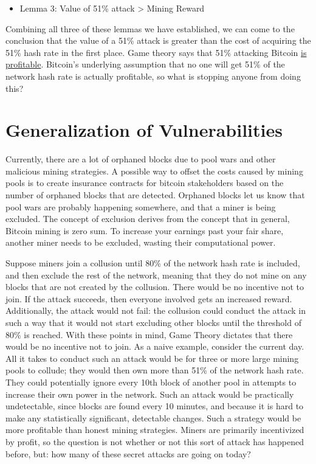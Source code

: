 \documentclass[full.tex]{subfiles}
\begin{document}
    \begin{itemize}
        \item Lemma 3: Value of 51\% attack > Mining Reward
    \end{itemize}
    
    Combining all three of these lemmas we have established, we can come to the conclusion that the value of a 51\% attack is greater than the cost of acquiring the 51\% hash rate in the first place. Game theory says that 51\% attacking Bitcoin \underline{is profitable}. Bitcoin's underlying assumption that no one will get 51\% of the network hash rate is actually profitable, so what is stopping anyone from doing this?
    
    \section*{Generalization of Vulnerabilities}
    
    Currently, there are a lot of orphaned blocks due to pool wars and other malicious mining strategies. A possible way to offset the costs caused by mining pools is to create insurance contracts for bitcoin stakeholders based on the number of orphaned blocks that are detected. Orphaned blocks let us know that pool wars are probably happening somewhere, and that a miner is being excluded. The concept of exclusion derives from the concept that in general, Bitcoin mining is zero sum. To increase your earnings past your fair share, another miner needs to be excluded, wasting their computational power. 
    
    Suppose miners join a collusion until 80\% of the network hash rate is included, and then exclude the rest of the network, meaning that they do not mine on any blocks that are not created by the collusion. There would be no incentive not to join. If the attack succeeds, then everyone involved gets an increased reward. Additionally, the attack would not fail: the collusion could conduct the attack in such a way that it would not start excluding other blocks until the threshold of 80\% is reached. With these points in mind, Game Theory dictates that there would be no incentive not to join. As a naive example, consider the current day. All it takes to conduct such an attack would be for three or more large mining pools to collude; they would then own more than 51\% of the network hash rate. They could potentially ignore every 10th block of another pool in attempts to increase their own power in the network. Such an attack would be practically undetectable, since blocks are found every 10 minutes, and because it is hard to make any statistically significant, detectable changes. Such a strategy would be more profitable than honest mining strategies. Miners are primarily incentivized by profit, so the question is not whether or not this sort of attack has happened before, but: how many of these secret attacks are going on today?
    
\end{document}
